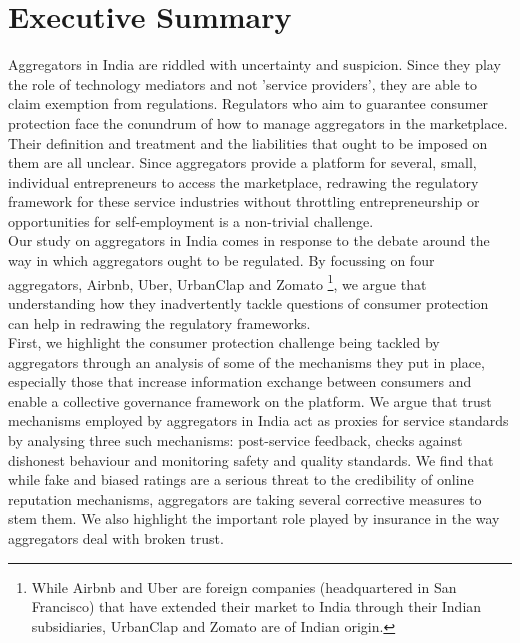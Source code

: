 \documentclass[a4paper, 12pt]{article}
\begin{document}
                    \section*{Executive Summary}
                   Aggregators in India are riddled with uncertainty and suspicion. Since they play the role of technology mediators and not 'service providers', they are able to claim exemption from regulations. Regulators who aim to guarantee consumer protection face the conundrum of how to manage aggregators in the marketplace. Their definition and treatment and the liabilities that ought to be imposed on them are all unclear. Since aggregators provide a platform for several, small, individual entrepreneurs to access the marketplace, redrawing the regulatory framework for these service industries without throttling entrepreneurship or opportunities for self-employment is a non-trivial challenge. \\
                    
                    Our study on aggregators in India comes in response to the debate around the way in which aggregators ought to be regulated. By focussing on four aggregators, Airbnb, Uber, UrbanClap and Zomato \footnote{While Airbnb and Uber are foreign companies (headquartered in San Francisco) that have extended their market to India through their Indian subsidiaries, UrbanClap and Zomato are of Indian origin.}, we argue that understanding how they inadvertently tackle questions of consumer protection can help in redrawing the regulatory frameworks. \\
                    
                   First, we highlight the consumer protection challenge being tackled by aggregators through an analysis of some of the mechanisms they put in place, especially those that increase information exchange between consumers and enable a collective governance framework on the platform. We argue that trust mechanisms employed by aggregators in India act as proxies for service standards by analysing three such mechanisms: post-service feedback, checks against dishonest behaviour and monitoring safety and quality standards. We find that while fake and biased ratings are a serious threat to the credibility of online reputation mechanisms, aggregators are taking several corrective measures to stem them. We also highlight the important role played by insurance in the way aggregators deal with broken trust.\\
                    
\end{document}
